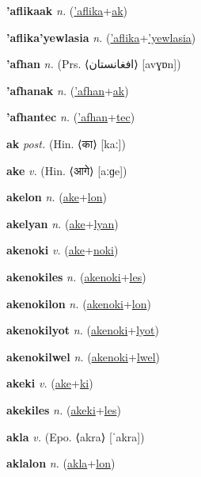 \textbf{\hypertarget{'aflikaak}{'aflikaak}} \textit{n.} (\hyperlink{'aflika}{'aflika}+\allowbreak \hyperlink{ak}{ak})


\textbf{\hypertarget{'aflika'yewlasia}{'aflika'yewlasia}} \textit{n.} (\hyperlink{'aflika}{'aflika}+\allowbreak \hyperlink{'yewlasia}{'yewlasia})


\textbf{\hypertarget{'afhan}{'afhan}} \textit{n.} (Prs. ⟨{\arabics{}افغانستان‬}⟩ [avɣɒn])


\textbf{\hypertarget{'afhanak}{'afhanak}} \textit{n.} (\hyperlink{'afhan}{'afhan}+\allowbreak \hyperlink{ak}{ak})


\textbf{\hypertarget{'afhantec}{'afhantec}} \textit{n.} (\hyperlink{'afhan}{'afhan}+\allowbreak \hyperlink{tec}{tec})


\textbf{\hypertarget{ak}{ak}} \textit{post.} (Hin. ⟨{\devanagari{}का}⟩ [kaː])


\textbf{\hypertarget{ake}{ake}} \textit{v.} (Hin. ⟨{\devanagari{}आगे}⟩ [aːɡe])


\textbf{\hypertarget{akelon}{akelon}} \textit{n.} (\hyperlink{ake}{ake}+\allowbreak \hyperlink{lon}{lon})


\textbf{\hypertarget{akelyan}{akelyan}} \textit{n.} (\hyperlink{ake}{ake}+\allowbreak \hyperlink{lyan}{lyan})


\textbf{\hypertarget{akenoki}{akenoki}} \textit{v.} (\hyperlink{ake}{ake}+\allowbreak \hyperlink{noki}{noki})


\textbf{\hypertarget{akenokiles}{akenokiles}} \textit{n.} (\hyperlink{akenoki}{akenoki}+\allowbreak \hyperlink{les}{les})


\textbf{\hypertarget{akenokilon}{akenokilon}} \textit{n.} (\hyperlink{akenoki}{akenoki}+\allowbreak \hyperlink{lon}{lon})


\textbf{\hypertarget{akenokilyot}{akenokilyot}} \textit{n.} (\hyperlink{akenoki}{akenoki}+\allowbreak \hyperlink{lyot}{lyot})


\textbf{\hypertarget{akenokilwel}{akenokilwel}} \textit{n.} (\hyperlink{akenoki}{akenoki}+\allowbreak \hyperlink{lwel}{lwel})


\textbf{\hypertarget{akeki}{akeki}} \textit{v.} (\hyperlink{ake}{ake}+\allowbreak \hyperlink{ki}{ki})


\textbf{\hypertarget{akekiles}{akekiles}} \textit{n.} (\hyperlink{akeki}{akeki}+\allowbreak \hyperlink{les}{les})


\textbf{\hypertarget{akla}{akla}} \textit{v.} (Epo. ⟨akra⟩ [ˈakra])


\textbf{\hypertarget{aklalon}{aklalon}} \textit{n.} (\hyperlink{akla}{akla}+\allowbreak \hyperlink{lon}{lon})


